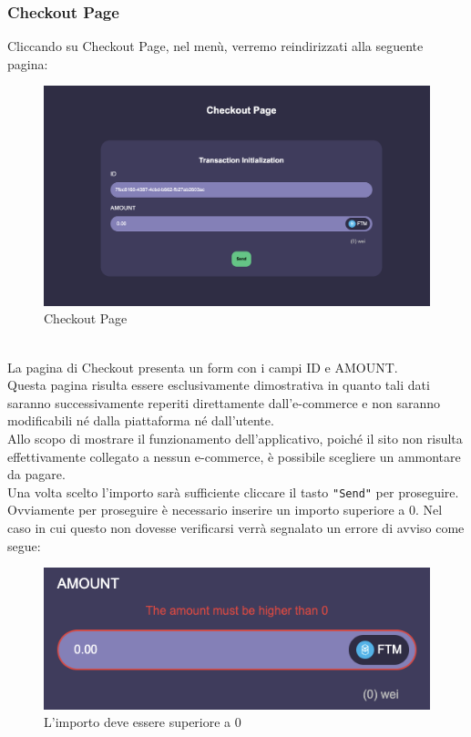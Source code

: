         \subsubsection{Checkout Page} \label{subsection: CheckoutPage}
        Cliccando su Checkout Page, nel menù, verremo reindirizzati alla seguente pagina:
        \begin{figure}[H]
            \centering
            \includegraphics[scale=0.3]{immagini/Checkout/Checkout.png}
            \caption{Checkout Page}
        \end{figure}
        \textbf{}\\
        La pagina di Checkout presenta un form con i campi ID e AMOUNT.\\
        Questa pagina risulta essere esclusivamente dimostrativa in quanto tali dati saranno successivamente reperiti direttamente dall'e-commerce\glo{} e non saranno modificabili né dalla piattaforma né dall'utente.\\
        Allo scopo di mostrare il funzionamento dell'applicativo, poiché il sito non risulta effettivamente collegato a nessun e-commerce\glo{}, è possibile scegliere un ammontare da pagare. \\
        Una volta scelto l'importo sarà sufficiente cliccare il tasto \texttt{"Send"} per proseguire.\\
        Ovviamente per proseguire è necessario inserire un importo superiore a 0. Nel caso in cui questo non dovesse verificarsi verrà segnalato un errore di avviso come segue:
        \begin{figure}[H]
            \centering
            \includegraphics[scale=0.4]{immagini/Checkout/biggerThanZero.png}
            \caption{L'importo deve essere superiore a 0}
        \end{figure}
